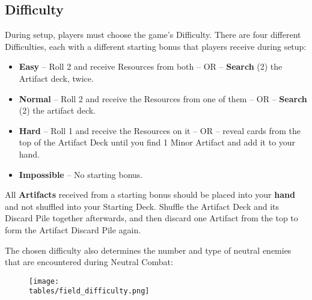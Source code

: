 \begin{multicols}{2}

\subsection*{\hypertarget{Difficulty}{Difficulty}}
During setup, players must choose the game's Difficulty.
There are four different Difficulties, each with a different starting bonus that players receive during setup:
\begin{itemize}
  \item \textbf{Easy} – Roll 2  and receive Resources from both – OR – \textbf{Search} (2) the Artifact deck, twice.
  \item \textbf{Normal} – Roll 2  and receive the Resources from one of them – OR – \textbf{Search} (2) the artifact deck.
  \item \textbf{Hard} – Roll 1  and receive the Resources on it – OR – reveal cards from the top of the Artifact Deck until you find 1 Minor Artifact and add it to your hand.
  \item \textbf{Impossible} – No starting bonus.
\end{itemize}
All \textbf{Artifacts} received from a starting bonus should be placed into your \textbf{hand} and not shuffled into your Starting Deck.
Shuffle the Artifact Deck and its Discard Pile together afterwards, and then discard one Artifact from the top to form the Artifact Discard Pile again.\par
The chosen difficulty also determines the number and type of neutral enemies that are encountered during Neutral Combat:

\end{multicols}

\vfill
\begin{figure*}[!hb]
  \centering
  \texttt{[image: \\tables/field\_difficulty.png]}
\end{figure*}
\vfill
